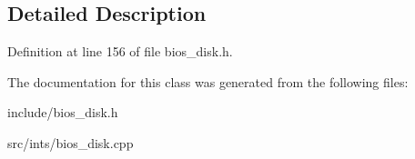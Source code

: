 \subsection{Detailed Description}


Definition at line 156 of file bios\-\_\-disk.\-h.



The documentation for this class was generated from the following files\-:\begin{DoxyCompactItemize}
\item 
include/bios\-\_\-disk.\-h\item 
src/ints/bios\-\_\-disk.\-cpp\end{DoxyCompactItemize}
